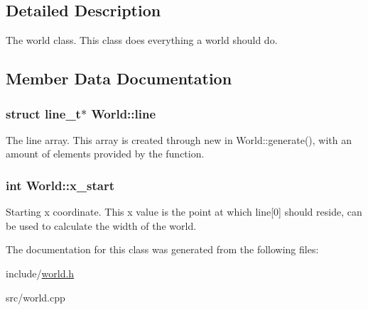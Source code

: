 \subsection{Detailed Description}
The world class. This class does everything a world should do. 

\subsection{Member Data Documentation}
\hypertarget{classWorld_afd9945f6ede5eabc3ff9243ce2b31247}{}
\subsubsection[{line}]{\setlength{\rightskip}{0pt plus 5cm}struct {\bf line\+\_\+t}$\ast$ World\+::line\hspace{0.3cm}{\ttfamily [protected]}}\label{classWorld_afd9945f6ede5eabc3ff9243ce2b31247}
The line array. This array is created through \textquotesingle{}new\textquotesingle{} in World\+::generate(), with an amount of elements provided by the function. \hypertarget{classWorld_a645767ccf316a9b4469db773ac111ae4}{}
\subsubsection[{x\+\_\+start}]{\setlength{\rightskip}{0pt plus 5cm}int World\+::x\+\_\+start\hspace{0.3cm}{\ttfamily [protected]}}\label{classWorld_a645767ccf316a9b4469db773ac111ae4}
Starting x coordinate. This x value is the point at which line\mbox{[}0\mbox{]} should reside, can be used to calculate the width of the world. 

The documentation for this class was generated from the following files\+:\begin{DoxyCompactItemize}
\item 
include/\hyperlink{world_8h}{world.\+h}\item 
src/world.\+cpp\end{DoxyCompactItemize}
